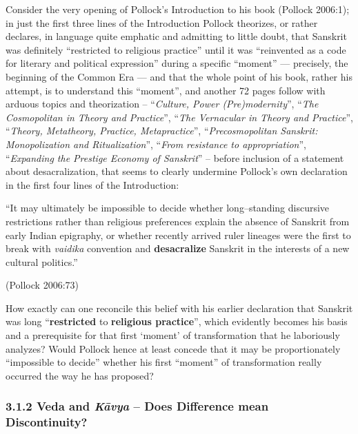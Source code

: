 Consider the very opening of Pollock’s Introduction to his book (Pollock 2006:1); in just the first three lines of the Introduction Pollock theorizes, or rather declares, in language quite emphatic and admitting to little doubt, that Sanskrit was definitely “restricted to religious practice” until it was “reinvented as a code for literary and political expression” during a specific “moment” — precisely, the beginning of the Common Era — and that the whole point of his book, rather his attempt, is to understand this “moment”, and another 72 pages follow with arduous topics and theorization – “\textit{Culture, Power (Pre)modernity}”, “\textit{The Cosmopolitan in Theory and Practice}”, “\textit{The Vernacular in Theory and Practice}”, “\textit{Theory, Metatheory, Practice, Metapractice}”, “\textit{Precosmopolitan Sanskrit: Monopolization and Ritualization}”, “\textit{From resistance to appropriation}”, “\textit{Expanding the Prestige Economy of Sanskrit}” – before inclusion of a statement about desacralization, that seems to clearly undermine Pollock’s own declaration in the first four lines of the Introduction:

\begin{myquote}
“It may ultimately be impossible to decide whether long–standing discursive restrictions rather than religious preferences explain the absence of Sanskrit from early Indian epigraphy, or whether recently arrived ruler lineages were the first to break with \textit{vaidika} convention and \textbf{desacralize} Sanskrit in the interests of a new cultural politics.” 
\end{myquote}

\hfill (Pollock 2006:73)

How exactly can one reconcile this belief with his earlier declaration that Sanskrit was long “\textbf{restricted} to \textbf{religious practice}”, which evidently becomes his basis and a prerequisite for that first ‘moment’ of transformation that he laboriously analyzes? Would Pollock hence at least concede that it may be proportionately “impossible to decide” whether his first “moment” of transformation really occurred the way he has proposed?


\subsubsection*{3.1.2 Veda and \textit{Kāvya} – Does Difference mean Discontinuity?}


